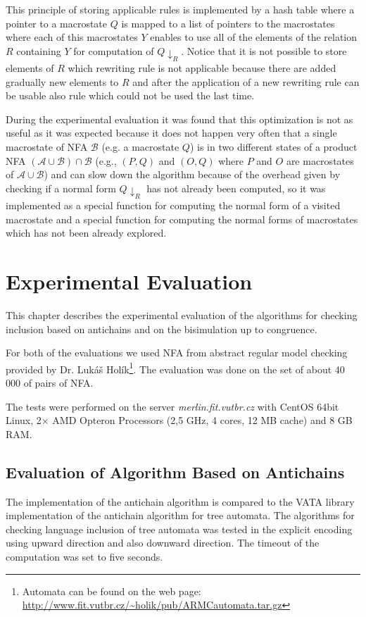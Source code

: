 This principle of storing applicable rules is implemented by a hash table where a pointer to a macrostate $Q$ is mapped to
a list of pointers to the macrostates where each of this macrostates $Y$ enables to use all of the elements of the relation $R$ containing $Y$ 
for computation of $Q{\downarrow_R}$.
Notice that it is not possible to store elements of $R$ which rewriting rule is not applicable because there are added gradually
new elements to $R$ and after the application of a new rewriting rule can be usable also rule which could not be used the last time.

During the experimental evaluation it was found that this optimization is not as useful as it was expected because it does not happen very often that a single
macrostate of NFA $\mathcal{B}$ (e.g. a macrostate $Q$) is in two different states of a 
product NFA $(\mathcal{A}\cup\mathcal{B})\cap\mathcal{B}$ (e.g., $(P,Q)$
and $(O,Q)$ where $P$ and $O$ are macrostates of $\mathcal{A}\cup\mathcal{B}$) and can slow down the algorithm because of the overhead given by checking
if a normal form $Q{\downarrow_R}$ has not already been computed, so it was implemented as a special function for computing the 
normal form of a visited macrostate and a special function for computing the normal forms of macrostates which has not been already explored. 

\chapter{Experimental Evaluation}
\label{eval}
This chapter describes the experimental evaluation of the algorithms for checking inclusion based on antichains and on the bisimulation up to congruence. 

For both of the evaluations we used NFA from abstract regular model checking provided by Dr. Lukáš Holík\footnote{
Automata can be found on the web page: \url{http://www.fit.vutbr.cz/~holik/pub/ARMCautomata.tar.gz}}.  
The evaluation was done on the set of about 40 000 of pairs of NFA. 

The tests were performed on the server \emph{merlin.fit.vutbr.cz} with CentOS 64bit Linux, 2$\times$ AMD Opteron Processors (2,5 GHz, 4 cores, 12 MB cache)
and 8 GB RAM.

\section{Evaluation of Algorithm Based on Antichains}
The implementation of the antichain algorithm is compared to the VATA library implementation of the antichain algorithm for tree automata. The
algorithms for checking language inclusion of tree automata was tested in the explicit encoding using upward direction and also downward direction. 
The timeout of the computation was set to five seconds.


